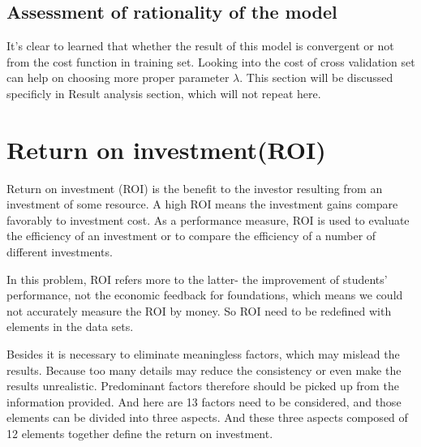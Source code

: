 \subsection{Assessment of rationality of the model}
It's clear to learned that whether the result of this model is convergent or not from the cost function in training set. Looking into the cost of cross validation set can help on choosing more proper parameter $\lambda$. This section will be discussed specificly in Result analysis section, which will not repeat here.

\section{Return on investment(ROI)}
	Return on investment (ROI) is the benefit to the investor resulting from an investment of some resource. A high ROI means the investment gains compare favorably to investment cost. As a performance measure, ROI is used to evaluate the efficiency of an investment or to compare the efficiency of a number of different investments\cite{url3}.

	In this problem, ROI refers more to the latter- the improvement of students' performance, not the economic feedback for foundations, which means we could not accurately measure the ROI by money. So ROI need to be redefined with elements in the data sets.

	Besides it is necessary to eliminate meaningless factors, which may mislead the results. Because too many details may reduce the consistency or even make the results unrealistic. Predominant factors therefore should be picked up from the information provided. And here are 13 factors need to be considered, and those elements can be divided into three aspects. And these three aspects composed of 12 elements together define the return on investment.

